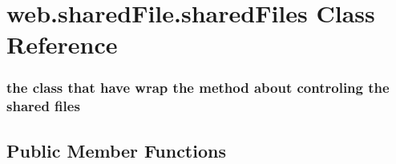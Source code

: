 \hypertarget{classweb_1_1shared_file_1_1shared_files}{\section{web.\-shared\-File.\-shared\-Files Class Reference}
\label{classweb_1_1shared_file_1_1shared_files}
}


\subsubsection*{the class that have wrap the method about controling the shared files } 


\subsection*{Public Member Functions}
